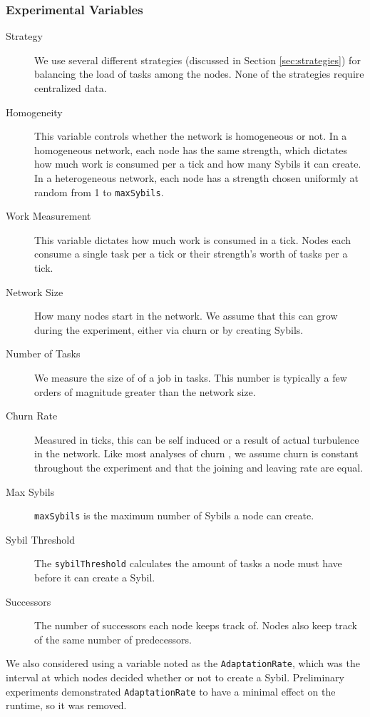 \subsubsection{Experimental Variables}
\begin{description}
	\item [Strategy] We use several different strategies (discussed in Section \ref{sec:strategies})  for balancing the load  of tasks among the nodes.
	None of the strategies require centralized data.
	\item [Homogeneity]  This variable controls whether the network is homogeneous or not.
	In a homogeneous network, each node has the same strength, which dictates how much work is consumed per a tick and how many Sybils it can create.
	In a heterogeneous network, each node has a strength chosen uniformly at random from 1 to \texttt{maxSybils}.
	\item [Work Measurement] This variable dictates how much work is consumed in a tick.
	Nodes each consume a single task per a tick or their strength's worth of tasks per a tick.
	\item [Network Size]  How many nodes start in the network.  
		We assume that this can grow during the experiment, either via churn or by creating Sybils.
	\item [Number of Tasks] We measure the size of of a job in tasks.
		This number is typically a few orders of magnitude greater than the network size.
	\item [Churn Rate] Measured in ticks, this can be self induced or a result of actual turbulence in the network.
		Like most analyses of churn \cite{marozzo2012p2p}, we assume churn is constant throughout the experiment and that the joining and leaving rate are equal.
	\item [Max Sybils] \texttt{maxSybils} is the maximum number of Sybils a node can create.
	\item [Sybil Threshold] The \texttt{sybilThreshold} calculates the amount of tasks a node must have before it can create a Sybil.
	\item [Successors] The number of successors each node keeps track of.  
	Nodes also keep track of the same number of predecessors.
		
\end{description}

We also considered using a variable noted as the \texttt{AdaptationRate}, which was the interval at which nodes decided whether or not to create a Sybil.
Preliminary experiments demonstrated \texttt{AdaptationRate} to have a minimal effect on the runtime, so it was removed.

